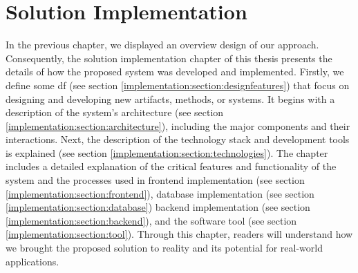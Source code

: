 
\chapter{Solution Implementation}

\ifpdf
    \graphicspath{{Chapters/Implementation/Figs/}{Chapters/Implementation/Figs/}{Chapters/Implementation/Figs/}}
\else
    \graphicspath{{Chapters/Implementation/Figs/}{Chapters/Implementation/Figs/}}
\fi
In the previous chapter, we displayed an overview design of our approach.
Consequently, the solution implementation chapter of this thesis presents the details of how the proposed system was developed and implemented.
Firstly, we define some \ac{df} (see section \ref{implementation:section:designfeatures}) that focus on designing and developing new artifacts, methods, or systems.
It begins with a description of the system's architecture (see section \ref{implementation:section:architecture}), including the major components and their interactions.
Next, the description of the technology stack and development tools is explained (see section \ref{implementation:section:technologies}).
The chapter includes a detailed explanation of the critical features and functionality of the system and the processes used in frontend implementation (see section \ref{implementation:section:frontend}), database implementation (see section \ref{implementation:section:database}) backend implementation (see section \ref{implementation:section:backend}), and the software tool (see section \ref{implementation:section:tool}).
Through this chapter, readers will understand how we brought the proposed solution to reality and its potential for real-world applications.


